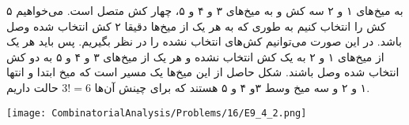 \p
به میخ‌های ۱ و ۲ سه کش و به میخ‌های ۳ و ۴ و ۵، چهار کش متصل است. می‌خواهیم ۵ کش را انتخاب کنیم به طوری که به هر یک از میخ‌ها دقیقا ۲ کش انتخاب شده وصل باشد. در این صورت می‌توانیم کش‌های انتخاب نشده را در نظر بگیریم. 
پس باید هر یک از میخ‌های ۱ و ۲ به یک کش انتخاب نشده و هر یک از میخ‌های ۳ و ۴ و ۵ به دو کش انتخاب شده وصل باشند.
شکل حاصل از این میخ‌ها یک مسیر است که میخ ابتدا و انتها ۱ و ۲ و سه میخ وسط ۳و ۴ و ۵ هستند که برای چینش آن‌ها
$3! = 6$
حالت داریم.
\begin{center}
  \texttt{[image: CombinatorialAnalysis/Problems/16/E9\_4\_2.png]}
\end{center}